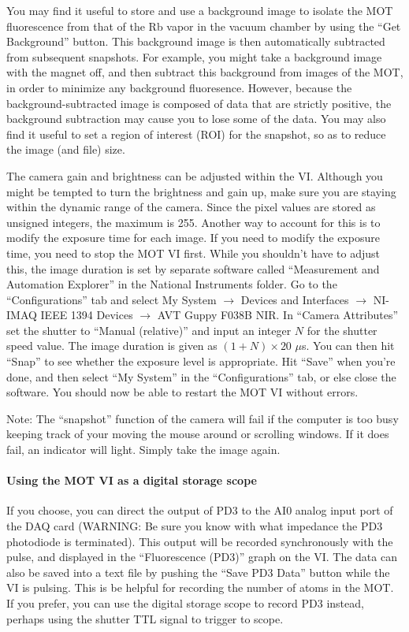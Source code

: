 \documentclass{../lab}
\begin{document}
You may find it useful to store and use a background image to isolate the MOT fluorescence from that of the Rb vapor in the vacuum chamber by using the ``Get Background'' button. This background image is then automatically subtracted from subsequent snapshots. For example, you might take a background image with the magnet off, and then subtract this background from images of the MOT, in order to minimize any background fluoresence. However, because the background-subtracted image is composed of data that are strictly positive, the background subtraction may cause you to lose some of the data. You may also find it useful to set a region of interest (ROI) for the snapshot, so as to reduce the image (and file) size.

The camera gain and brightness can be adjusted within the VI. Although you might be tempted to turn the brightness and gain up, make sure you are staying within the dynamic range of the camera. Since the pixel values are stored as unsigned integers, the maximum is 255. Another way to account for this is to modify the exposure time for each image. If you need to modify the exposure time, you need to stop the MOT VI first. While you shouldn't have to adjust this, the image duration is set by separate software called ``Measurement and Automation Explorer'' in the National Instruments folder. Go to the ``Configurations'' tab and select My System $\rightarrow$ Devices and Interfaces $\rightarrow$ NI-IMAQ IEEE 1394 Devices $\rightarrow$ AVT Guppy F038B NIR. In ``Camera Attributes'' set the shutter to ``Manual (relative)'' and input an integer $N$ for the shutter speed value. The image duration is given as $(1+N) \times 20$  $\mu$s. You can then hit ``Snap'' to see whether the exposure level is appropriate. Hit ``Save'' when you're done, and then select ``My System'' in the ``Configurations'' tab, or else close the software. You should now be able to restart the MOT VI without errors.

Note: The ``snapshot'' function of the camera will fail if the computer is too busy keeping track of your moving the mouse around or scrolling windows. If it does fail, an indicator will light. Simply take the image again.

\paragraph{Using the MOT VI as a digital storage scope}

If you choose, you can direct the output of PD3 to the AI0 analog input port of the DAQ card (WARNING: Be sure you know with what impedance the PD3 photodiode is terminated). This output will be recorded synchronously with the pulse, and displayed in the ``Fluorescence (PD3)'' graph on the VI. The data can also be saved into a text file by pushing the ``Save PD3 Data'' button while the VI is pulsing. This is be helpful for recording the number of atoms in the MOT. If you prefer, you can use the digital storage scope to record PD3 instead, perhaps using the shutter TTL signal to trigger to scope.
\end{document}
